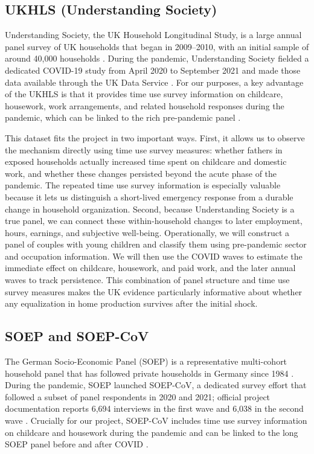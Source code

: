 \documentclass[12pt]{article}
\begin{document}
\subsection{UKHLS (Understanding Society)}

Understanding Society, the UK Household Longitudinal Study, is a large annual panel survey of UK households that began in 2009--2010, with an initial sample of around 40{,}000 households \citep{ukhls_design}. During the pandemic, Understanding Society fielded a dedicated COVID-19 study from April 2020 to September 2021 and made those data available through the UK Data Service \citep{ukhls_covid,ukhls_access,ukhls_release}. For our purposes, a key advantage of the UKHLS is that it provides time use survey information on childcare, housework, work arrangements, and related household responses during the pandemic, which can be linked to the rich pre-pandemic panel \citep{sevilla2020baby}.

This dataset fits the project in two important ways. First, it allows us to observe the mechanism directly using time use survey measures: whether fathers in exposed households actually increased time spent on childcare and domestic work, and whether these changes persisted beyond the acute phase of the pandemic. The repeated time use survey information is especially valuable because it lets us distinguish a short-lived emergency response from a durable change in household organization. Second, because Understanding Society is a true panel, we can connect these within-household changes to later employment, hours, earnings, and subjective well-being. Operationally, we will construct a panel of couples with young children and classify them using pre-pandemic sector and occupation information. We will then use the COVID waves to estimate the immediate effect on childcare, housework, and paid work, and the later annual waves to track persistence. This combination of panel structure and time use survey measures makes the UK evidence particularly informative about whether any equalization in home production survives after the initial shock.

\subsection{SOEP and SOEP-CoV}

The German Socio-Economic Panel (SOEP) is a representative multi-cohort household panel that has followed private households in Germany since 1984 \citep{soep_core}. During the pandemic, SOEP launched SOEP-CoV, a dedicated survey effort that followed a subset of panel respondents in 2020 and 2021; official project documentation reports 6,694 interviews in the first wave and 6,038 in the second wave \citep{soepcov_doc,soepcov_overview}. Crucially for our project, SOEP-CoV includes time use survey information on childcare and housework during the pandemic and can be linked to the long SOEP panel before and after COVID \citep{soepcov_childcare}.
\end{document}
